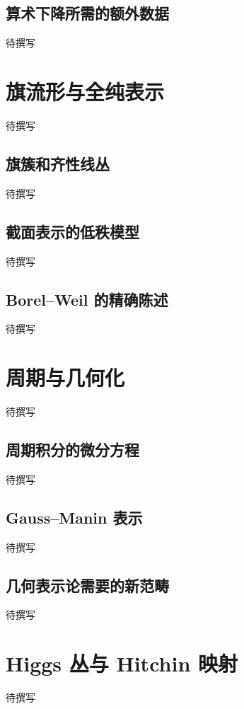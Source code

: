 \subsection{算术下降所需的额外数据}
\label{g4:subsec:F01:03}
待撰写

\section{旗流形与全纯表示}
\label{g4:sec:F02}
待撰写

\subsection{旗簇和齐性线丛}
\label{g4:subsec:F02:01}
待撰写

\subsection{截面表示的低秩模型}
\label{g4:subsec:F02:02}
待撰写

\subsection{Borel–Weil 的精确陈述}
\label{g4:subsec:F02:03}
待撰写

\section{周期与几何化}
\label{g4:sec:F03}
待撰写

\subsection{周期积分的微分方程}
\label{g4:subsec:F03:01}
待撰写

\subsection{Gauss–Manin 表示}
\label{g4:subsec:F03:02}
待撰写

\subsection{几何表示论需要的新范畴}
\label{g4:subsec:F03:03}
待撰写

\section{Higgs 丛与 Hitchin 映射}
\label{g4:sec:F04}
待撰写

